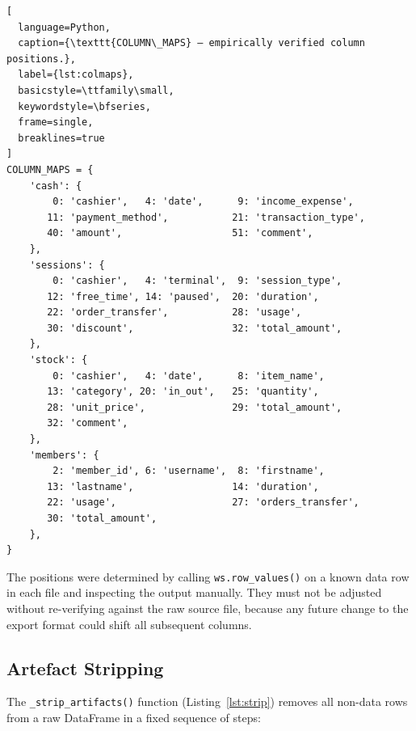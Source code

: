\begin{lstlisting}[
  language=Python,
  caption={\texttt{COLUMN\_MAPS} — empirically verified column positions.},
  label={lst:colmaps},
  basicstyle=\ttfamily\small,
  keywordstyle=\bfseries,
  frame=single,
  breaklines=true
]
COLUMN_MAPS = {
    'cash': {
        0: 'cashier',   4: 'date',      9: 'income_expense',
       11: 'payment_method',           21: 'transaction_type',
       40: 'amount',                   51: 'comment',
    },
    'sessions': {
        0: 'cashier',   4: 'terminal',  9: 'session_type',
       12: 'free_time', 14: 'paused',  20: 'duration',
       22: 'order_transfer',           28: 'usage',
       30: 'discount',                 32: 'total_amount',
    },
    'stock': {
        0: 'cashier',   4: 'date',      8: 'item_name',
       13: 'category', 20: 'in_out',   25: 'quantity',
       28: 'unit_price',               29: 'total_amount',
       32: 'comment',
    },
    'members': {
        2: 'member_id', 6: 'username',  8: 'firstname',
       13: 'lastname',                 14: 'duration',
       22: 'usage',                    27: 'orders_transfer',
       30: 'total_amount',
    },
}
\end{lstlisting}

The positions were determined by calling \texttt{ws.row\_values()} on a known
data row in each file and inspecting the output manually. They must not be
adjusted without re-verifying against the raw source file, because any future
change to the export format could shift all subsequent columns.

\subsection{Artefact Stripping}

The \texttt{\_strip\_artifacts()} function (Listing~\ref{lst:strip}) removes all
non-data rows from a raw DataFrame in a fixed sequence of steps:

